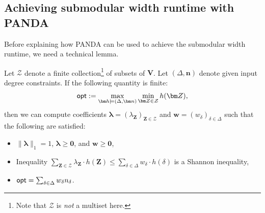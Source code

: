 \documentclass{theoretics}
\newcommand{\norm}[1]{\|#1\|}
\newcommand{\opt}{\text{\sf opt}}
\newcommand{\calZ}{\mathcal Z}
\newcommand{\panda}{\textsf{PANDA}\xspace}
\begin{document}
\subsection{Achieving submodular width runtime with \panda}
\label{subsec:panda:subw}

Before explaining how \panda can be used to achieve the submodular width runtime,
we need a technical lemma.
\begin{lemma}
  \label{lmm:technical}
  Let $\calZ$ denote a finite collection\footnote{Note that $\calZ$ is {\em not} a multiset here.} of subsets of $\bm V$.
  Let $(\Delta,\bm n)$ denote given input degree constraints.
  If the following quantity is finite:
  \begin{align}
    \opt := \max_{\bm h \models (\Delta,\bm n)} \min_{\bm Z \in \calZ} h(\bm Z),
    \label{eq:max:min:problem}
  \end{align}
  then we can compute coefficients
  $\bm\lambda = (\lambda_{\bm Z})_{{\bm Z} \in \calZ}$ and
  $\bm w = (w_{\delta})_{\delta \in \Delta}$ such that the following are
  satisfied:
  \begin{itemize}
    \item[(a)] $\norm{\bm \lambda}_1=1$, $\bm \lambda \geq \bm 0$, and $\bm w \geq \bm 0$,
    \item[(b)]
  Inequality $\sum_{{\bm Z} \in \calZ} \lambda_{\bm Z} \cdot h({\bm Z}) \leq \sum_{\delta \in \Delta} w_\delta \cdot h(\delta)$
  is a Shannon inequality,
    \item[(c)] $\opt = \sum_{\delta\in\Delta}w_\delta n_\delta$.
  \end{itemize}
\end{lemma}
\end{document}
